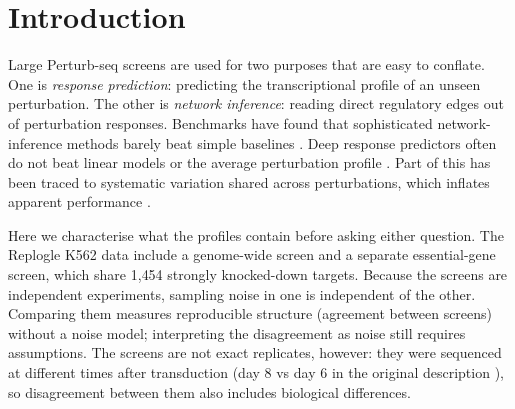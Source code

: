 \documentclass[10pt]{article}
\begin{document}
\begin{abstract}
Promoter binding (1~kb upstream, 197 TFs) shows no detectable discrimination of knockdown responders under our responder definition. This holds for measured ChIP-seq binding as well as for motif occupancy, so the failure is not attributable to the occupancy approximation.

Across contexts (Norman 2019; Wessels 2023), strong responses shared by both contexts rarely reverse sign (1.4\% and 1.1\%). Gene-level context differences (nominal $|z_\text{diff}|>3$) occur at 8.5$\times$ and 3.0$\times$ the rate expected under a noise-matched null; reversals are 1.8\% and 1.1\% of these, and the remainder are changes in size, gains, losses and intermediate-strength changes.

Together, these results bound what perturbation responses can say about direct regulatory edges. Simulation studies of model components (memory-based hidden-regulator detection, intervention-induced indirect edges, prior forms, propagation depth) are reported in the Supplement as estimator-specific results.
\end{abstract}

\section{Introduction}
Large Perturb-seq screens \citep{replogle2022} are used for two purposes that are easy to conflate. One is \emph{response prediction}: predicting the transcriptional profile of an unseen perturbation. The other is \emph{network inference}: reading direct regulatory edges out of perturbation responses. Benchmarks have found that sophisticated network-inference methods barely beat simple baselines \citep{chevalley2025causalbench}. Deep response predictors often do not beat linear models or the average perturbation profile \citep{ahlmann2025linear}. Part of this has been traced to systematic variation shared across perturbations, which inflates apparent performance \citep{vinas2026systema}.

Here we characterise what the profiles contain before asking either question. The Replogle K562 data include a genome-wide screen and a separate essential-gene screen, which share 1{,}454 strongly knocked-down targets. Because the screens are independent experiments, sampling noise in one is independent of the other. Comparing them measures reproducible structure (agreement between screens) without a noise model; interpreting the disagreement as noise still requires assumptions. The screens are not exact replicates, however: they were sequenced at different times after transduction (day 8 vs day 6 in the original description \citep{replogle2022}), so disagreement between them also includes biological differences.
\end{document}
